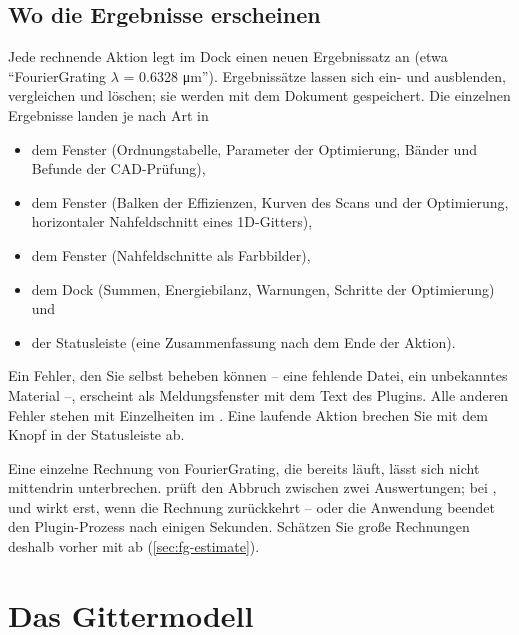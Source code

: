 \subsection{Wo die Ergebnisse erscheinen}

Jede rechnende Aktion legt im Dock  einen neuen Ergebnissatz an (etwa
\enquote{FourierGrating $\lambda$ = 0.6328 \si{\micro\metre}}). Ergebnissätze lassen sich
ein- und ausblenden, vergleichen und löschen; sie werden mit dem Dokument gespeichert. Die
einzelnen Ergebnisse landen je nach Art in

\begin{itemize}
  \item dem Fenster  (Ordnungstabelle, Parameter der Optimierung, Bänder und Befunde der
    CAD-Prüfung),
  \item dem Fenster  (Balken der Effizienzen, Kurven des Scans und der Optimierung,
    horizontaler Nahfeldschnitt eines 1D-Gitters),
  \item dem Fenster  (Nahfeldschnitte als Farbbilder),
  \item dem Dock  (Summen, Energiebilanz, Warnungen, Schritte der Optimierung) und
  \item der Statusleiste (eine Zusammenfassung nach dem Ende der Aktion).
\end{itemize}

Ein Fehler, den Sie selbst beheben können -- eine fehlende Datei, ein unbekanntes Material --,
erscheint als Meldungsfenster mit dem Text des Plugins. Alle anderen Fehler stehen mit
Einzelheiten im . Eine laufende Aktion brechen Sie mit dem Knopf  in der
Statusleiste ab.

\begin{hinweis}
Eine einzelne Rechnung von FourierGrating, die bereits läuft, lässt sich nicht mittendrin
unterbrechen.  prüft den Abbruch zwischen zwei Auswertungen; bei ,
 und  wirkt  erst, wenn die Rechnung zurückkehrt -- oder die
Anwendung beendet den Plugin-Prozess nach einigen Sekunden. Schätzen Sie große Rechnungen deshalb
vorher mit  ab (\autoref{sec:fg-estimate}).
\end{hinweis}

\section{Das Gittermodell}\label{sec:fg-modell}

